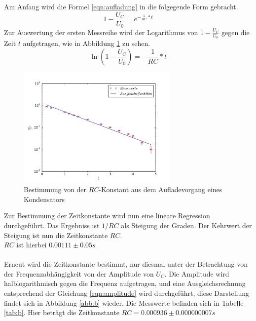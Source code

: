 Am Anfang wird die Formel \eqref{eqn:aufladung} in die folgegende
Form gebracht.
\begin{equation}
1-\frac{U_C}{U_0}=e^{-{\frac{1}{RC}*t}}
\end{equation}
Zur Auswertung der ersten Messreihe wird der Logarithmus
von $1-\frac{U_C}{U_0}$ gegen die Zeit $t$ aufgetragen, wie in Abbildung \ref{abb:a} zu sehen.
\begin{equation}
  \ln \left(1-\frac{U_C}{U_0}\right)=-\frac{1}{RC}*t
\end{equation}
\begin{figure}[!h]
  \centering
  \includegraphics[width=0.7\textwidth]{a.pdf}
  \caption{Bestimmung von der $RC$-Konstant aus dem
  Aufladevorgang eines Kondensators}
\label{abb:a}
\end{figure}
\FloatBarrier
Zur Bestimmung der Zeitkonstante wird nun eine lineare Regression durchgeführt.
Das Ergebniss ist $1/RC$ als Steigung der Graden.
Der Kehrwert der Steigung ist nun die Zeitkonstante $RC$.\\
$RC$ ist hierbei $0.00111\pm0.05 s$
\\
\\
Erneut wird die Zeitkonstante bestimmt, nur diesmal unter
der Betrachtung von der Frequenzabhängigkeit von der Amplitude von $U_C$.
Die Amplitude wird halblogarithmisch gegen die Frequenz aufgetragen, und eine Ausgleichsrechnung
entsprechend der Gleichung \eqref{eqn:amplitude} wird durchgeführt,
diese Darstellung findet sich in Abbildung \ref{abb:b} wieder.
Die Messwerte befinden sich in Tabelle \ref{tab:b}.
Hier beträgt die Zeitkonstante $RC=0.000936 \pm 0.000000007s$
